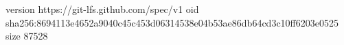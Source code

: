 version https://git-lfs.github.com/spec/v1
oid sha256:8694113e4652a9040c45c453d06314538e04b53ae86db64cd3c10ff6203e0525
size 87528
